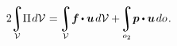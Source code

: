 \nopagebreak\vspace{-0.1em}\begin{equation}\label{clapeyron:elasticitytheorem}
2 \hspace{-0.2em}
\integral\displaylimits_{\mathcal{V}} \hspace{-0.5ex} \potentialenergydensity \hspace{.2ex} d\mathcal{V} \hspace{.12ex}
= \hspace{-0.2ex}
\integral\displaylimits_{\mathcal{V}} \hspace{-0.4ex} \bm{f} \hspace{-0.1ex} \dotp \bm{u} \hspace{.25ex} d\mathcal{V}
+ \hspace{-0.3ex}
\integral\displaylimits_{o_2} \hspace{-0.4ex} \bm{p} \dotp \bm{u} \hspace{.25ex} do
\hspace{.2ex} .
\end{equation}

